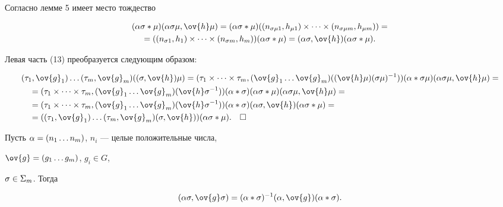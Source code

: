 Согласно лемме 5 имеет место тождество


\begin{multline*}


(\al\s * \mu)(\al\s\mu,\ov{h}\mu)=


(\al\s * \mu) ((n_{\s\mu1},h_{\mu1}) \times \dotsb \times


(n_{\s\mu{m}},h_{\mu{m}}))= \\


=((n_{\s1},h_1) \times \dotsb \times (n_{\s{m}},h_{m}))(\al\s * \mu)=


(\al\s,\ov{h})(\al\s * \mu).


\end{multline*}





Левая часть (13) преобразуется следующим образом:


\begin{align*}


&(\t_1,\ov{g}_1) \dotsc (\t_m,\ov{g}_m)((\s,\ov{h})\mu)=


(\t_1 \times \dotsb \times \t_m,


(\ov{g}_1 \dotsc \ov{g}_m) ((\ov{h}\mu)(\s\mu)^{-1}))


(\al * \s\mu)(\al\s\mu,\ov{h}\mu)= \\


%


&\quad=(\t_1 \times \dotsb \times \t_m,


(\ov{g}_1 \dotsc \ov{g}_m) (\ov{h}\s^{-1}))


(\al * \s)(\al\s * \mu)(\al\s\mu,\ov{h}\mu)= \\


%


&\quad=(\t_1 \times \dotsb \times \t_m,


(\ov{g}_1 \dotsc \ov{g}_m) (\ov{h}\s^{-1}))


(\al * \s)(\al\s,\ov{h})(\al\s * \mu)= \\


%


&\quad=((\t_1,\ov{g}_1) \dotsc (\t_m,\ov{g}_m) (\s,\ov{h}))


(\al\s * \mu).\quad\square


\end{align*}





\begin{lem}


Пусть $\alpha=(n_1 \dotsc n_m)$, $n_i$ --- целые положительные числа,


$\ov{g}=(g_1 \dotsc g_m)$, $g_i \in G$,


$\sigma \in \Sigma_m$. Тогда


\begin{equation}


(\al\s,\ov{g}\s)=(\al * \s)^{-1} (\al, \ov{g})(\al * \s).


\end{equation}


\end{lem}





